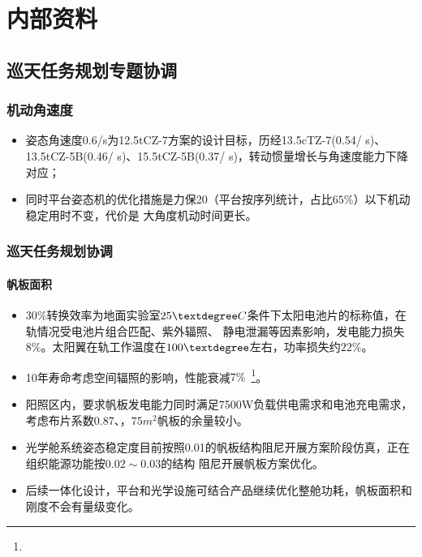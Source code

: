 
\chapter{内部资料}
\label{chap_internal}

\section{巡天任务规划专题协调}
\label{internal_sec_1}

\subsection{机动角速度}
\begin{itemize}
\item[1] 姿态角速度0.6\textdegree/s为12.5tCZ-7方案的设计目标，历经13.5cTZ-7(0.54\textdegree / s)、
13.5tCZ-5B(0.46\textdegree / s)、15.5tCZ-5B(0.37\textdegree / s)，转动惯量增长与角速度能力下降对应；
\item[2] 同时平台姿态机的优化措施是力保20\textdegree（平台按序列统计，占比$65\%$）以下机动稳定用时不变，代价是
大角度机动时间更长。
\end{itemize}
 
\subsection{巡天任务规划协调}
\subsubsection{帆板面积}
\begin{itemize}
\item $30\%$转换效率为地面实验室$25\textdegree C$条件下太阳电池片的标称值，在轨情况受电池片组合匹配、紫外辐照、
静电泄漏等因素影响，发电能力损失$8\%$。太阳翼在轨工作温度在$100\textdegree$左右，功率损失约$22\%$。

\item 10年寿命考虑空间辐照的影响，性能衰减$7\%$~\footnote{}。

\item 阳照区内，要求帆板发电能力同时满足7500W负载供电需求和电池充电需求，考虑布片系数0.87、，$75m^2$帆板的余量较小。

\item 光学舱系统姿态稳定度目前按照0.01的帆板结构阻尼开展方案阶段仿真，正在组织能源功能按$0.02\sim 0.03$的结构
阻尼开展帆板方案优化。

\item 后续一体化设计，平台和光学设施可结合产品继续优化整舱功耗，帆板面积和刚度不会有量级变化。
\end{itemize}

